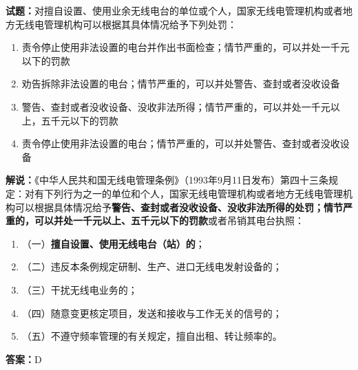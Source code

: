 \documentclass{ctexbook}
\begin{document}
\noindent\textbf{试题：}对擅自设置、使用业余无线电台的单位或个人，国家无线电管理机构或者地方无线电管理机构可以根据其具体情况给予下列处罚：
\begin{enumerate}[leftmargin=3em]
\item 责令停止使用非法设置的电台并作出书面检查；情节严重的，可以并处一千元以下的罚款
\item 劝告拆除非法设置的电台；情节严重的，可以并处警告、查封或者没收设备
\item 警告、查封或者没收设备、没收非法所得；情节严重的，可以并处一千元以上，五千元以下的罚款
\item 责令停止使用非法设置的电台；情节严重的，可以并处警告、查封或者没收设备
\end{enumerate}
\noindent\textbf{解说：}《中华人民共和国无线电管理条例》（1993年9月11日发布）第四十三条规定：对有下列行为之一的单位和个人，国家无线电管理机构或者地方无线电管理机构可以根据具体情况给予\textbf{警告、查封或者没收设备、没收非法所得的处罚；情节严重的，可以并处一千元以上、五千元以下的罚款}或者吊销其电台执照：
\begin{enumerate}[leftmargin=3em, label=]
	\item（一）\textbf{擅自设置、使用无线电台（站）的}；
	\item（二）违反本条例规定研制、生产、进口无线电发射设备的；
	\item（三）干扰无线电业务的；
	\item（四）随意变更核定项目，发送和接收与工作无关的信号的；
	\item（五）不遵守频率管理的有关规定，擅自出租、转让频率的。
\end{enumerate}
\textbf{答案：}D


\bigskip
\end{document}
